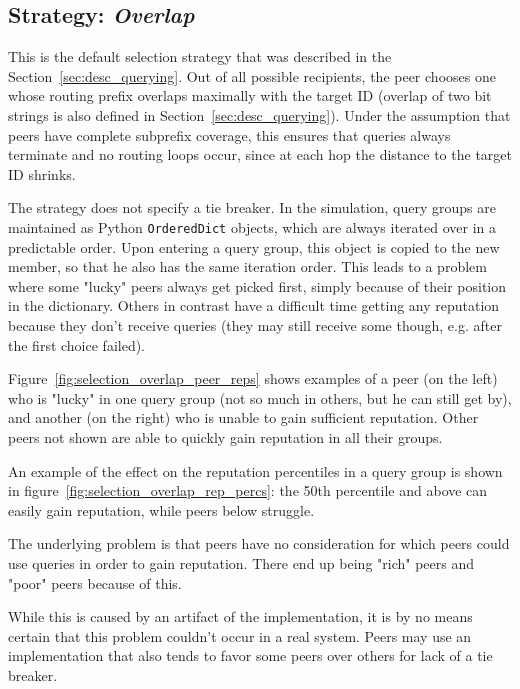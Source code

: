 \subsection{Strategy: \emph{Overlap}}
\label{sec:rep_avail_selection_overlap}
This is the default selection strategy that was described in the
Section~\ref{sec:desc_querying}. Out of all possible recipients, the peer
chooses one whose routing prefix overlaps maximally with the target ID (overlap
of two bit strings is also defined in Section~\ref{sec:desc_querying}). Under
the assumption that peers have complete subprefix coverage, this ensures that
queries always terminate and no routing loops occur, since at each hop the
distance to the target ID shrinks.

The strategy does not specify a tie breaker. In the simulation, query groups are
maintained as Python \texttt{OrderedDict} objects, which are always iterated
over in a predictable order. Upon entering a query group, this object is copied
to the new member, so that he also has the same iteration order. This leads to a
problem where some "lucky" peers always get picked first, simply because of
their position in the dictionary. Others in contrast have a difficult time
getting any reputation because they don't receive queries (they may still
receive some though, e.g. after the first choice failed).

Figure~\ref{fig:selection_overlap_peer_reps} shows examples of a peer (on the
left) who is "lucky" in one query group (not so much in others, but he can still
get by), and another (on the right) who is unable to gain sufficient reputation.
Other peers not shown are able to quickly gain reputation in all their groups.

An example of the effect on the reputation percentiles in a query group is shown
in figure~\ref{fig:selection_overlap_rep_percs}: the 50th percentile and above
can easily gain reputation, while peers below struggle.

The underlying problem is that peers have no consideration for which peers could
use queries in order to gain reputation. There end up being "rich" peers and
"poor" peers because of this.

While this is caused by an artifact of the implementation, it is by no means
certain that this problem couldn't occur in a real system. Peers may use an
implementation that also tends to favor some peers over others for lack of a tie
breaker.

